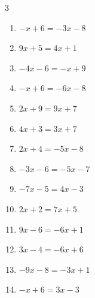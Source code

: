 \begin{multicols}{3}
\begin{enumerate}

  \item $-x+6=-3x-8$

        \phantom{$\displaystyle x=-7$}

  \item $9x+5=4x+1$


  \item $-4x-6=-x+9$

        \phantom{$\displaystyle x=-5$}

  \item $-x+6=-6x-8$


  \item $2x+9=9x+7$


  \item $4x+3=3x+7$

        \phantom{$\displaystyle x=4$}

  \item $2x+4=-5x-8$


  \item $-3x-6=-5x-7$


  \item $-7x-5=4x-3$


  \item $2x+2=7x+5$


  \item $9x-6=-6x+1$


  \item $3x-4=-6x+6$


  \item $-9x-8=-3x+1$


  \item $-x+6=3x-3$


\end{enumerate}
\end{multicols}
